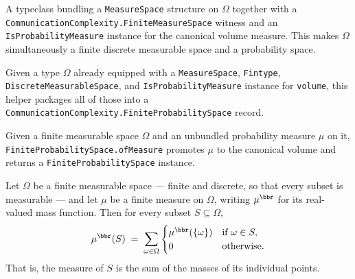 \begin{definition}
\label{CommunicationComplexity.FiniteProbabilitySpace}
\leanok
{}
A typeclass bundling a \texttt{MeasureSpace} structure on $\Omega$ together with a
\texttt{CommunicationComplexity.FiniteMeasureSpace} witness and an \texttt{IsProbabilityMeasure} instance for the
canonical volume measure.  This makes $\Omega$ simultaneously a finite discrete
measurable space and a probability space.
\end{definition}

\begin{definition}
\label{CommunicationComplexity.FiniteProbabilitySpace.of}
\leanok
{}
Given a type $\Omega$ already equipped with a \texttt{MeasureSpace}, \texttt{Fintype},
\texttt{DiscreteMeasurableSpace}, and \texttt{IsProbabilityMeasure} instance for
\texttt{volume}, this helper packages all of those into a \texttt{CommunicationComplexity.FiniteProbabilitySpace}
record.
\end{definition}

\begin{definition}
\label{CommunicationComplexity.FiniteProbabilitySpace.ofMeasure}
\leanok
{}
Given a finite measurable space $\Omega$ and an unbundled probability measure $\mu$ on
it, \texttt{FiniteProbabilitySpace.ofMeasure} promotes $\mu$ to the canonical volume and
returns a \texttt{FiniteProbabilitySpace} instance.
\end{definition}

\begin{theorem}
\label{CommunicationComplexity.FiniteMeasureSpace.measureReal_eq_sum_singletons}
\leanok
{}
Let $\Omega$ be a finite measurable space — finite and discrete, so that every subset is
measurable — and let $\mu$ be a finite measure on $\Omega$, writing $\mu^{\bbr}$ for its
real-valued mass function. Then for every subset $S \subseteq \Omega$,
\[
  \mu^{\bbr}(S) \;=\; \sum_{\omega \in \Omega}
\begin{cases} \mu^{\bbr}(\{\omega\}) & \text{if } \omega \in S, \\ 0 & \text{otherwise.}
\end{cases}
\]
That is, the measure of $S$ is the sum of the masses of its individual points.
\end{theorem}

